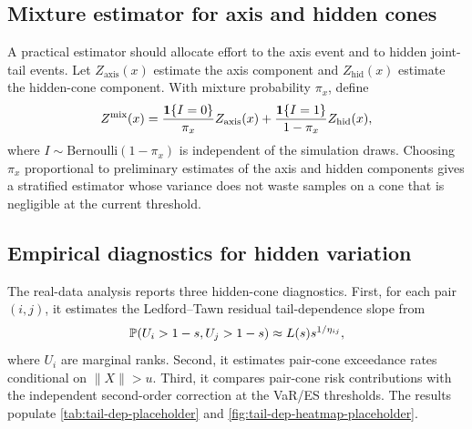 \subsection{Mixture estimator for axis and hidden cones}

A practical estimator should allocate effort to the axis event and to hidden
joint-tail events. Let \(Z_{\mathrm{axis}}(x)\) estimate the axis component and
\(Z_{\mathrm{hid}}(x)\) estimate the hidden-cone component. With mixture
probability \(\pi_x\), define
\[
  Z^{\mathrm{mix}}(x)
  =\frac{\mathbf{1}\{I=0\}}{\pi_x}Z_{\mathrm{axis}}(x)
   +\frac{\mathbf{1}\{I=1\}}{1-\pi_x}Z_{\mathrm{hid}}(x),
\]
where \(I\sim\mathrm{Bernoulli}(1-
\pi_x)\) is independent of the simulation draws. Choosing
\(\pi_x\) proportional to preliminary estimates of the axis and hidden
components gives a stratified estimator whose variance does not waste samples
on a cone that is negligible at the current threshold.



\subsection{Empirical diagnostics for hidden variation}

The real-data analysis reports three hidden-cone diagnostics. First, for each
pair \((i,j)\), it estimates the Ledford--Tawn residual tail-dependence slope
from
\[
  \mathbb{P}(U_i>1-s,U_j>1-s)\approx L(s)s^{1/\eta_{ij}},
\]
where \(U_i\) are marginal ranks. Second, it estimates pair-cone exceedance
rates conditional on \(\|X\|>u\). Third, it compares pair-cone risk
contributions with the independent second-order correction at the VaR/ES
thresholds. The results populate \cref{tab:tail-dep-placeholder} and
\cref{fig:tail-dep-heatmap-placeholder}.
